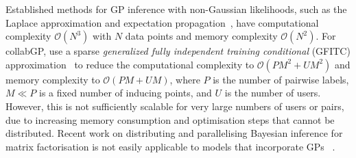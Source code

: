 Established methods for GP inference with non-Gaussian likelihoods,
such as the Laplace approximation 
and expectation propagation~\citep{rasmussen_gaussian_2006}, have
computational complexity $\mathcal{O}(N^3)$ with $N$ data points
 and memory complexity $\mathcal{O}(N^2)$. 
For collabGP, \citet{houlsby2012collaborative}
use a sparse \emph{generalized fully independent training conditional} (GFITC) 
approximation~\citep{snelson2006sparse} to reduce the computational complexity to $\mathcal{O}(PM^2 + UM^2)$ and 
memory complexity to $\mathcal{O}(PM + UM)$,
where $P$ is the number of pairwise labels, 
$M \ll P$ is a fixed number of inducing points, 
and $U$ is the number of users.
However, this is not sufficiently scalable
for very large numbers of users or pairs, 
due to increasing memory consumption 
and optimisation steps that cannot be distributed. %
Recent work on distributing and parallelising Bayesian inference 
for matrix factorisation 
is not easily applicable to models that incorporate GPs
 ~\citep{ahn2015large,saha2015scalable,vander2017distributed,chen2018large}. 
 
